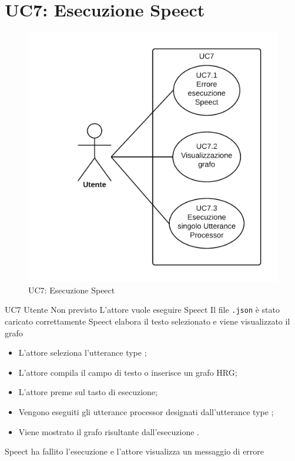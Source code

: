 \documentclass[../AnalisideiRequisiti.tex]{subfiles}
\begin{document}
\section{UC7: Esecuzione Speect}
\begin{figure}[H]
	\centering
	\includegraphics[width=\textwidth]{../img/UC7.png}
	\caption{UC7: Esecuzione Speect}
\end{figure}
\UserCase
{UC7}
{Utente}
{Non previsto}
{L'attore vuole eseguire Speect}
{Il file \verb|.json| è stato caricato correttamente }
{Speect elabora il testo selezionato e viene visualizzato il grafo}
{\begin{itemize}
		\item{} L'attore seleziona l'utterance type ;
		\item{} L'attore compila il campo di testo o inserisce un grafo HRG;
		\item{} L'attore preme sul tasto di esecuzione;
		\item{} Vengono eseguiti gli utterance processor designati dall'utterance type ;
		\item{} Viene mostrato il grafo risultante dall'esecuzione .
	\end{itemize}
}
{Speect ha fallito l'esecuzione e l'attore visualizza un messaggio di errore }
\end{document}
